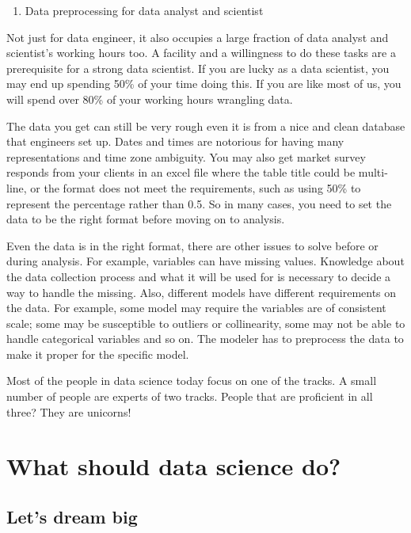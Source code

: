 \documentclass[12pt,]{krantz}
\providecommand{\tightlist}{%
  \setlength{\itemsep}{0pt}\setlength{\parskip}{0pt}}
\begin{document}
\begin{enumerate}
\def\labelenumi{(\arabic{enumi})}
\setcounter{enumi}{1}
\tightlist
\item
  Data preprocessing for data analyst and scientist
\end{enumerate}

Not just for data engineer, it also occupies a large fraction of data analyst and scientist's working hours too. A facility and a willingness to do these tasks are a prerequisite for a strong data scientist. If you are lucky as a data scientist, you may end up spending 50\% of your time doing this. If you are like most of us, you will spend over 80\% of your working hours wrangling data.

The data you get can still be very rough even it is from a nice and clean database that engineers set up. Dates and times are notorious for having many representations and time zone ambiguity. You may also get market survey responds from your clients in an excel file where the table title could be multi-line, or the format does not meet the requirements, such as using 50\% to represent the percentage rather than 0.5. So in many cases, you need to set the data to be the right format before moving on to analysis.

Even the data is in the right format, there are other issues to solve before or during analysis. For example, variables can have missing values. Knowledge about the data collection process and what it will be used for is necessary to decide a way to handle the missing. Also, different models have different requirements on the data. For example, some model may require the variables are of consistent scale; some may be susceptible to outliers or collinearity, some may not be able to handle categorical variables and so on. The modeler has to preprocess the data to make it proper for the specific model.

Most of the people in data science today focus on one of the tracks. A small number of people are experts of two tracks. People that are proficient in all three? They are unicorns!

\hypertarget{what-should-data-science-do}{%
\section{What should data science do?}\label{what-should-data-science-do}}

\hypertarget{lets-dream-big}{%
\subsection{Let's dream big}\label{lets-dream-big}}
\end{document}
